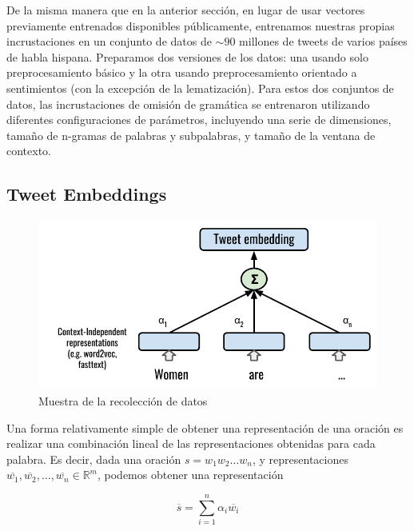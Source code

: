 De la misma manera que en la anterior sección, en lugar de usar vectores previamente entrenados disponibles públicamente, entrenamos nuestras propias incrustaciones en un conjunto de datos de $ \sim90 $ millones de tweets de varios países de habla hispana.
Preparamos dos versiones de los datos: una usando solo preprocesamiento básico y la otra usando preprocesamiento orientado a sentimientos (con la excepción de la lematización). Para estos dos conjuntos de datos, las incrustaciones de omisión de gramática se entrenaron utilizando diferentes configuraciones de parámetros, incluyendo una serie de dimensiones, tamaño de n-gramas de palabras y subpalabras, y tamaño de la ventana de contexto.

\subsection{Tweet Embeddings}
\label{sec:sif}


\begin{figure}[t]
    \centering
    \includegraphics[width=\textwidth]{img/tweet_embeddings.pdf}
    \caption{Muestra de la recolección de datos}
    \label{fig:tweet_embeddings}
\end{figure}

Una forma relativamente simple de obtener una representación de una oración es realizar una combinación lineal de las representaciones obtenidas para cada palabra. Es decir, dada una oración $s = w_1 w_2 \ldots w_n$, y representaciones $\overline{w_1}, \overline{w_2}, \ldots, \overline{w_n} \in \mathbb{R}^m$, podemos obtener una representación

\begin{equation}
    \overline{s} = \sum\limits_{i=1}^{n} \alpha_i \overline{w_i}
\end{equation}

